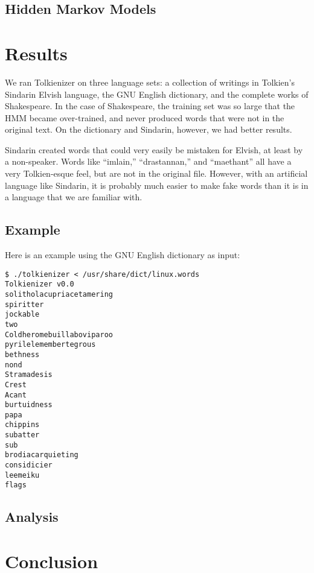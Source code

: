 \documentclass[10pt]{article}
\begin{document}
\subsection{Hidden Markov Models}

\section{Results}

We ran Tolkienizer on three language sets: a collection of writings in
Tolkien's Sindarin Elvish language, the GNU English dictionary, and the
complete works of Shakespeare.  In the case of Shakespeare, the training set
was so large that the HMM became over-trained, and never produced words that
were not in the original text.  On the dictionary and Sindarin, however, we had
better results.

Sindarin created words that could very easily be mistaken for Elvish, at least
by a non-speaker.  Words like ``imlain,'' ``drastannan,'' and ``maethant'' all
have a very Tolkien-esque feel, but are not in the original file.  However,
with an artificial language like Sindarin, it is probably much easier to make
fake words than it is in a language that we are familiar with.

\subsection{Example}

Here is an example using the GNU English dictionary as input:

\begin{verbatim}
$ ./tolkienizer < /usr/share/dict/linux.words
Tolkienizer v0.0
solitholacupriacetamering
spiritter
jockable
two
Coldheromebuillaboviparoo
pyrilelemembertegrous
bethness
nond
Stramadesis
Crest
Acant
burtuidness
papa
chippins
subatter
sub
brodiacarquieting
considicier
leemeiku
flags
\end{verbatim}

\subsection{Analysis}

\section{Conclusion}
\end{document}
